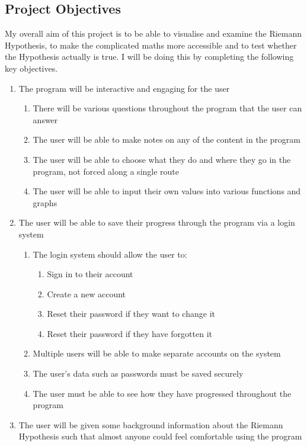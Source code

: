 \documentclass[12pt]{article}
\begin{document}
\subsection{Project Objectives}
My overall aim of this project is to be able to visualise and examine the Riemann Hypothesis, to make the complicated maths more accessible and to test whether the Hypothesis actually is true. I will be doing this by completing the following key objectives.
\begin{enumerate}
    \item The program will be interactive and engaging for the user
        \begin{enumerate}
            \item There will be various questions throughout the program that the user can answer
            \item The user will be able to make notes on any of the content in the program
            \item The user will be able to choose what they do and where they go in the program, not forced along a single route
            \item The user will be able to input their own values into various functions and graphs
        \end{enumerate}
    \item The user will be able to save their progress through the program via a login system
    \begin{enumerate}
        \item The login system should allow the user to:
        \begin{enumerate}
            \item Sign in to their account
            \item Create a new account
            \item Reset their password if they want to change it
            \item Reset their password if they have forgotten it
        \end{enumerate}
        \item Multiple users will be able to make separate accounts on the system
        \item The user's data such as passwords must be saved securely
        \item The user must be able to see how they have progressed throughout the program
    \end{enumerate}
    \item The user will be given some background information about the Riemann Hypothesis such that almost anyone could feel comfortable using the program

\end{enumerate}
\end{document}
